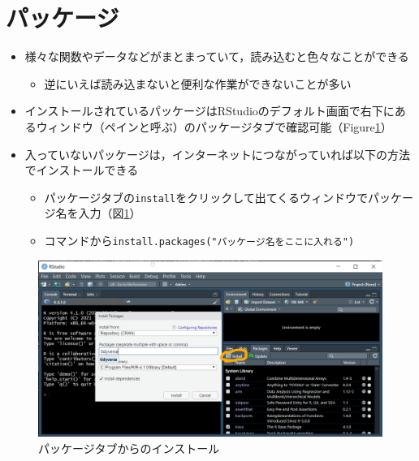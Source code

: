 \documentclass[
  xelatex,ja=standard, b5paper]{bxjsbook}
\providecommand{\tightlist}{%
  \setlength{\itemsep}{0pt}\setlength{\parskip}{0pt}}
\begin{document}
\hypertarget{p-package}{%
\section{パッケージ}\label{p-package}}

\begin{itemize}
\tightlist
\item
  様々な関数やデータなどがまとまっていて，読み込むと色々なことができる

  \begin{itemize}
  \tightlist
  \item
    逆にいえば読み込まないと便利な作業ができないことが多い
  \end{itemize}
\item
  インストールされているパッケージはRStudioのデフォルト画面で右下にあるウィンドウ（ペインと呼ぶ）のパッケージタブで確認可能（Figure\ref{fig:pinst}）\\
\item
  入っていないパッケージは，インターネットにつながっていれば以下の方法でインストールできる

  \begin{itemize}
  \tightlist
  \item
    パッケージタブの\texttt{install}をクリックして出てくるウィンドウでパッケージ名を入力（図\ref{fig:pinst}）
  \item
    コマンドから\texttt{install.packages("パッケージ名をここに入れる")}
  \end{itemize}
\end{itemize}

\begin{figure}

{\centering \includegraphics[width=0.8\linewidth]{images/package_install} 

}

\caption{パッケージタブからのインストール}\label{fig:pinst}
\end{figure}
\end{document}
